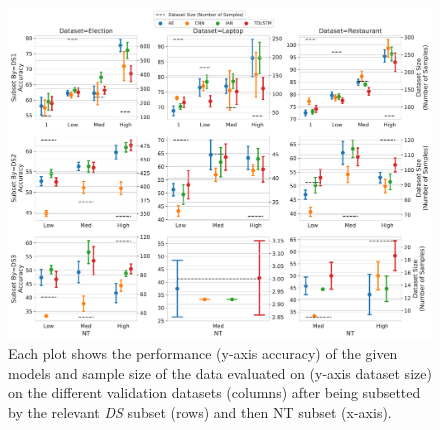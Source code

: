 \begin{figure}[h!]
    \centering
    \includegraphics[scale=0.4]{images/augmentation/methods_performance/baseline/baseline_ds_nt_validation_scores.pdf}
    \caption{Each plot shows the performance (y-axis accuracy) of the given models and sample size of the data evaluated on (y-axis dataset size) on the different validation datasets (columns) after being subsetted by the relevant \textit{DS} subset (rows) and then NT subset (x-axis).}
    \label{fig:aug_baseline_ds_nt_validation_scores}
\end{figure}

